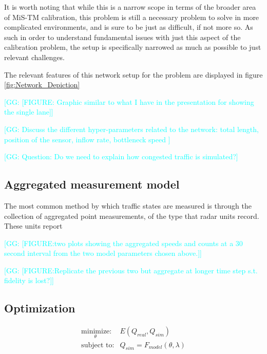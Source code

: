 \documentclass[english,titlepage,oneside,12pt]{article}
\newcommand{\kibitz}[2]{\ifnum\Comments=0\textcolor{#1}{#2}\fi}
\newcommand{\George}[1]{\kibitz{cyan}      {[GG: #1]}}
\begin{document}
It is worth noting that while this is a narrow scope in terms of the broader area of MiS-TM calibration, this problem is still a necessary problem to solve in more complicated environments, and is sure to be just as difficult, if not more so. As such in order to understand fundamental issues with just this aspect of the calibration problem, the setup is specifically narrowed as much as possible to just relevant challenges.

The relevant features of this network setup for the problem are displayed in figure \ref{fig:Network_Depiction}

\George{[FIGURE: Graphic similar to what I have in the presentation for showing the single lane]}

\George{Discuss the different hyper-parameters related to the network: total length, position of the sensor, inflow rate, bottleneck speed }

\George{Question: Do we need to explain how congested traffic is simulated?}

\subsection{Aggregated measurement model}
The most common method by which traffic states are measured is through the collection of aggregated point measurements, of the type that radar units record. These units report

\George{[FIGURE:two plots showing the aggregated speeds and counts at a 30 second interval from the two model parameters chosen above.]}

\George{[FIGURE:Replicate the previous two but aggregate at longer time step s.t. fidelity is lost?]}


\subsection{Optimization}

\begin{equation}\label{eq:Optimization_Problem}
\begin{array}{rl}
\underset{\theta}
{{\text{minimize}}}: & E(Q_{real},Q_{sim})\\
\text{subject to:}
 & Q_{sim} = F_{model}(\theta,\lambda)
\end{array}
\end{equation}



\end{document}
